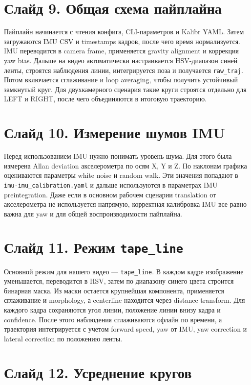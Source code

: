 \documentclass[12pt,a4paper]{article}
\newcommand{\code}[1]{\texttt{#1}}
\begin{document}
\section*{Слайд 9. Общая схема пайплайна}

Пайплайн начинается с чтения конфига, CLI-параметров и Kalibr YAML. Затем загружаются IMU CSV и timestamps кадров, после чего время нормализуется. IMU переводится в camera frame, применяется gravity alignment и коррекция yaw bias. Дальше на видео автоматически настраивается HSV-диапазон синей ленты, строятся наблюдения линии, интегрируется поза и получается \code{raw\_traj}. Потом включается сглаживание и loop averaging, чтобы получить устойчивый замкнутый круг. Для двухкамерного сценария такие круги строятся отдельно для LEFT и RIGHT, после чего объединяются в итоговую траекторию.

\section*{Слайд 10. Измерение шумов IMU}

Перед использованием IMU нужно понимать уровень шума. Для этого была измерена Allan deviation акселерометра по осям X, Y и Z. По наклонам графика оцениваются параметры white noise и random walk. Эти значения попадают в \code{imu-imu\_calibration.yaml} и дальше используются в параметрах IMU preintegration. Даже если в основном рабочем сценарии translation от акселерометра не используется напрямую, корректная калибровка IMU все равно важна для yaw и для общей воспроизводимости пайплайна.

\section*{Слайд 11. Режим \code{tape\_line}}

Основной режим для нашего видео --- \code{tape\_line}. В каждом кадре изображение уменьшается, переводится в HSV, затем по диапазону синего цвета строится бинарная маска. Из маски остается крупнейшая компонента, применяется сглаживание и morphology, а centerline находится через distance transform. Для каждого кадра сохраняются угол линии, положение линии внизу кадра и confidence. После этого наблюдения сглаживаются офлайн по времени, а траектория интегрируется с учетом forward speed, yaw от IMU, yaw correction и lateral correction по положению ленты.

\section*{Слайд 12. Усреднение кругов}
\end{document}
